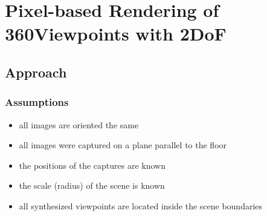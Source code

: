 \chapter{Pixel-based Rendering of 360\degree Viewpoints with 2DoF}
\section{Approach}

\subsection{Assumptions}
\begin{itemize}
  \item all images are oriented the same
  \item all images were captured on a plane parallel to the floor
  \item the positions of the captures are known
  \item the scale (radius) of the scene is known
  \item all synthesized viewpoints are located inside the scene boundaries
\end{itemize}

